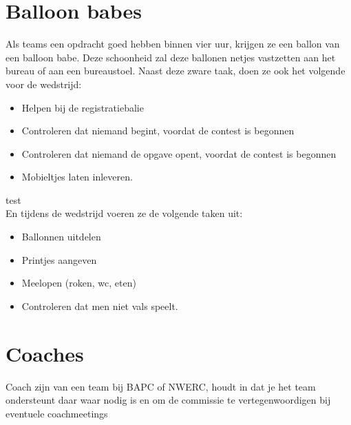 \section{Balloon babes}
Als teams een opdracht goed hebben binnen vier uur, krijgen ze een ballon van een balloon babe. Deze schoonheid zal deze ballonen netjes vastzetten aan het bureau of aan een bureaustoel. Naast deze zware taak, doen ze ook het volgende voor de wedstrijd:
\begin{itemize}
\item Helpen bij de registratiebalie
\item Controleren dat niemand begint, voordat de contest is begonnen
\item Controleren dat niemand de opgave opent, voordat de contest is begonnen
\item Mobieltjes laten inleveren.
\end{itemize}
{\color{white}test}\\
En tijdens de wedstrijd voeren ze de volgende taken uit:
\begin{itemize}
\item Ballonnen uitdelen
\item Printjes aangeven
\item Meelopen (roken, wc, eten)
\item Controleren dat men niet vals speelt.
\end{itemize}

\section{Coaches}
Coach zijn van een team bij BAPC of NWERC, houdt in dat je het team ondersteunt daar waar nodig is en om de commissie te vertegenwoordigen bij eventuele coachmeetings 

